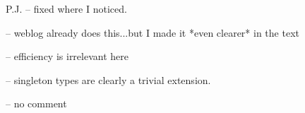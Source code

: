 
P.J. -- fixed where I noticed.





-- weblog already does this...but I made it *even clearer* in the text


-- efficiency is irrelevant here

-- singleton types are clearly a trivial extension. 

-- no comment








